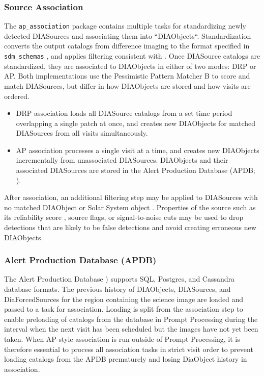 

\subsubsection{Source Association}
\label{sec:association}

The \texttt{ap\_association} package contains multiple tasks for standardizing newly detected DIASources and associating them into ``DIAObjects``.
Standardization converts the output catalogs from difference imaging to the format specified in \texttt{sdm\_schemas} , and applies filtering consistent with \citet{DMTN-199}.
Once DIASource catalogs are standardized, they are associated to DIAObjects in either of two modes: DRP or AP.
Both implementations use the Pessimistic Pattern Matcher B \citep{DMTN-031} to score and match DIASources, but differ in how DIAObjects are stored and how visits are ordered.

\begin{itemize}
\item DRP association loads all DIASource catalogs from a set time period overlapping a single patch at once, and creates new DIAObjects for matched DIASources from all visits simultaneously.
\item AP association processes a single visit at a time, and creates new DIAObjects incrementally from unassociated DIASources.
DIAObjects and their associated DIASources are stored in the Alert Production Database (APDB; ).
\end{itemize}

After association, an additional filtering step may be applied to DIASources with no matched DIAObject or Solar System object .
Properties of the source such as its reliability score , source flags, or signal-to-noise cuts may be used to drop detections that are likely to be false detections and avoid creating erroneous new DIAObjects.

\subsubsection{Alert Production Database (APDB)}
\label{sec:apdb}

The Alert Production Database \citep[APDB;][]{DMTN-293}) supports SQL, Postgres, and Cassandra database formats.
The previous history of DIAObjects, DIASources, and DiaForcedSources for the region containing the science image are loaded and passed to a task for association.
Loading is split from the association step to enable preloading of catalogs from the database in Prompt Processing during the interval when the next visit has been scheduled but the images have not yet been taken.
When AP-style association is run outside of Prompt Processing, it is therefore essential to process all association tasks in strict visit order to prevent loading catalogs from the APDB prematurely and losing DiaObject history in association.

